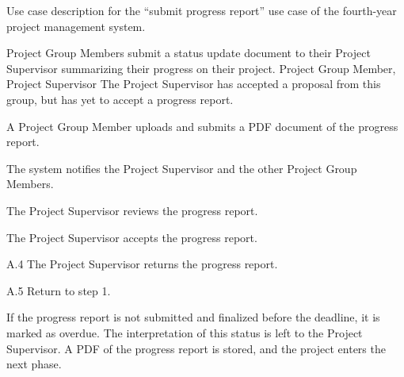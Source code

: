 \documentclass[document.tex]{subfiles}
\begin{document}
\begin{table}
  \centering
  \caption{Use case description for the ``submit progress report'' use case of the fourth-year project management system.}
  \label{tbl:use-case-submit-progress-report}

  \begin{usecase}
    Project Group Members submit a status update document to their Project Supervisor summarizing their progress on their project.
    Project Group Member, Project Supervisor
    The Project Supervisor has accepted a proposal from this group, but has yet to accept a progress report.
    \ucnormal
    \begin{ucenum}
      \item A Project Group Member uploads and submits a PDF document of the progress report.
      \item The system notifies the Project Supervisor and the other Project Group Members.
      \item The Project Supervisor reviews the progress report.
      \item The Project Supervisor accepts the progress report.
    \end{ucenum}
    \begin{ucenum}
      \item [A.4] The Project Supervisor returns the progress report.
      \item [A.5] Return to step 1.
    \end{ucenum}
    If the progress report is not submitted and finalized before the deadline, it is marked as overdue. The interpretation of this status is left to the Project Supervisor.
    A PDF of the progress report is stored, and the project enters the next phase.
  \end{usecase}
\end{table}
\end{document}
